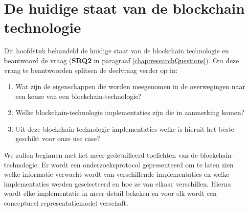 \chapter{De huidige staat van de blockchain technologie}\label{chap: currentState}
Dit hoofdstuk behandeld de huidige staat van de blockchain technologie en beantwoord de vraag \researchQuestionTwo (\textbf{SRQ2} in paragraaf \ref{chap:researchQuestions}). Om deze vraag te beantwoorden splitsen de deelvraag verder op in: 
\begin{enumerate}
	\item Wat zijn de eigenschappen die worden meegenomen in de overwegingen naar een keuze van een blockchain-technologie?
	\item Welke blockchain-technologie implementaties zijn die in aanmerking komen? 
	\item Uit deze blockchain-technologie implementaties welke is hieruit het beste geschikt voor onze use case?
\end{enumerate}

We zullen beginnen met het meer gedetailleerd toelichten van de blockchain-technologie. Er wordt een onderzoeksprotocol gepresenteerd om te laten zien welke informatie verwacht wordt van verschillende implementaties en welke implementaties werden geselecteerd en hoe ze van elkaar verschillen. Hierna wordt elke implementatie in meer detail bekeken en voor elk wordt een conceptueel representatiemodel verschaft.